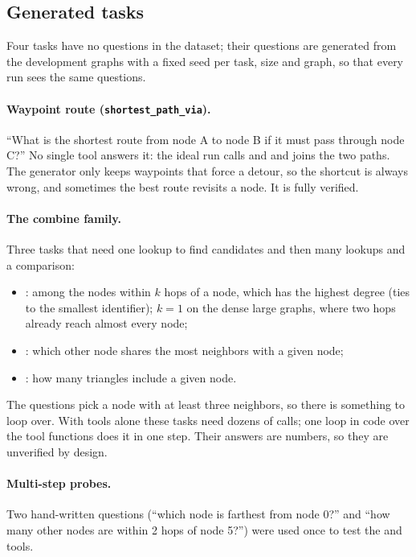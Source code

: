 \subsection{Generated tasks}

Four tasks have no questions in the dataset; their questions are generated from the development graphs with a fixed
seed per task, size and graph, so that every run sees the same questions.

\paragraph{Waypoint route (\texttt{shortest\_path\_via}).} ``What is the shortest route from node A to node B if it must
pass through node C?'' No single tool answers it: the ideal run calls  and
 and joins the two paths. The generator only keeps waypoints that force a detour, so the
shortcut  is always wrong, and sometimes the best route revisits a node. It is fully
verified.

\paragraph{The combine family.} Three tasks that need one lookup to find candidates and then many lookups and a
comparison:
\begin{itemize}
  \item {}: among the nodes within $k$ hops of a node, which has the highest degree (ties to the
        smallest identifier); $k = 1$ on the dense large graphs, where two hops already reach almost every node;
  \item {}: which other node shares the most neighbors with a given node;
  \item {}: how many triangles include a given node.
\end{itemize}
The questions pick a node with at least three neighbors, so there is something to loop over. With tools alone these
tasks need dozens of calls; one loop in code over the tool functions does it in one step. Their answers are numbers,
so they are unverified by design.

\paragraph{Multi-step probes.} Two hand-written questions (``which node is farthest from node 0?'' and ``how many other
nodes are within 2 hops of node 5?'') were used once to test the  and  tools.

